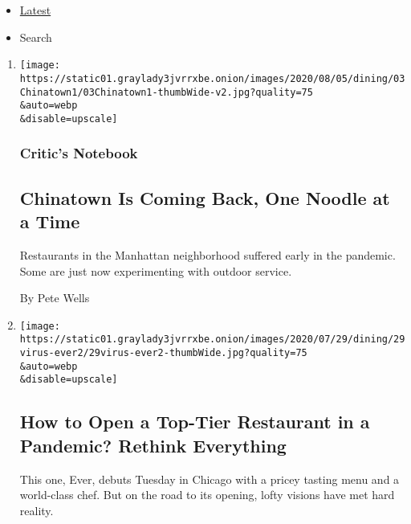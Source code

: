 \begin{itemize}
\tightlist
\item
  \protect\hyperlink{stream-panel}{Latest}
\item
  Search
\end{itemize}

\begin{enumerate}
\def\labelenumi{\arabic{enumi}.}
\item
  \href{/2020/08/03/dining/chinatown-outdoor-dining-coronavirus.html}{}

  \texttt{[image: https://static01.graylady3jvrrxbe.onion/images/2020/08/05/dining/03Chinatown1/03Chinatown1-thumbWide-v2.jpg?quality=75\\\&auto=webp\\\&disable=upscale]}

  \hypertarget{critics-notebook}{%
  \subsubsection{Critic's Notebook}\label{critics-notebook}}

  \hypertarget{chinatown-is-coming-back-one-noodle-at-a-time}{%
  \subsection{Chinatown Is Coming Back, One Noodle at a
  Time}\label{chinatown-is-coming-back-one-noodle-at-a-time}}

  Restaurants in the Manhattan neighborhood suffered early in the
  pandemic. Some are just now experimenting with outdoor service.

  By Pete Wells
\item
  \href{/2020/07/28/dining/ever-chicago-restaurant-coronavirus.html}{}

  \texttt{[image: https://static01.graylady3jvrrxbe.onion/images/2020/07/29/dining/29virus-ever2/29virus-ever2-thumbWide.jpg?quality=75\\\&auto=webp\\\&disable=upscale]}

  \hypertarget{how-to-open-a-top-tier-restaurant-in-a-pandemic-rethink-everything}{%
  \subsection{How to Open a Top-Tier Restaurant in a Pandemic? Rethink
  Everything}\label{how-to-open-a-top-tier-restaurant-in-a-pandemic-rethink-everything}}

  This one, Ever, debuts Tuesday in Chicago with a pricey tasting menu
  and a world-class chef. But on the road to its opening, lofty visions
  have met hard reality.


\end{enumerate}
